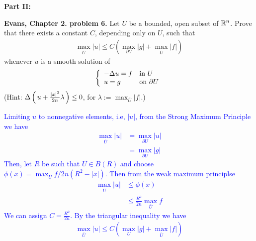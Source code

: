 \documentclass[10pt,a4paper]{report}
\newcommand{\BLUE}[1]{\textcolor{blue}{#1}}
\begin{document}
\begin{description}
	\item \textbf{Part II:}
	
	\textbf{Evans, Chapter 2. problem 6.}  Let $U$ be a bounded, open subset of $\mathbb{R}^n$.  Prove that there exists a constant $C$, depending only on $U$, such that
	\begin{align*}
		\max_{\bar{U}} |u| \le C(\max_{\partial U} |g|+\max_{\bar U}|f|)
	\end{align*}whenever $u$ is a smooth solution of 
	\begin{align*}
		\left \{ \begin{array}{ll} -\Delta u = f & \text{in } U\\ u=g & \text{on } \partial U \end{array} \right .
	\end{align*}(Hint: $\Delta \left (\, u+\frac{|x|^2}{2n}\lambda \,\right ) \le 0$, for $\lambda := \max_{\bar U} |f|$.)
	
	\BLUE{Limiting $u$ to nonnegative elements, i.e, $|u|$, from the Strong Maximum Principle we have 
	\begin{align*}
		\max_{\bar U} |u| &= \max_{\partial U} |u| \\
		&= \max_{\partial U} |g|
	\end{align*}Then, let $R$ be such that $U \in B(R)$ and choose $\phi(x) = \max_{\bar U} f/2n (R^2-|x|)$.  Then from the weak maximum principlse
	\begin{align*}
		\max_{\bar U} |u| &\le \phi(x) \\
		&\le \frac{R^2}{2n} \max_{\bar U} f
	\end{align*}We can assign $C = \frac{R^2}{2n}$.  By the triangular inequality we have
	\begin{align*}
		\max_{\bar U} |u| \le C(\max_{U}|g|+\max_{\bar U} |f|)
	\end{align*}
	}

\end{description}
\end{document}
